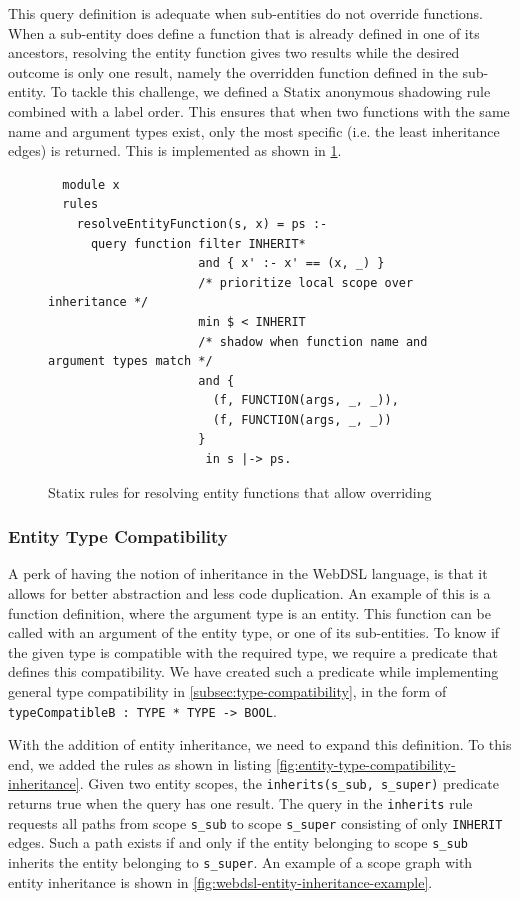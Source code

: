      This query definition is adequate when sub-entities do not override functions. When a sub-entity does define a function that is already defined in one of its ancestors, resolving the entity function gives two results while the desired outcome is only one result, namely the overridden function defined in the sub-entity. To tackle this challenge, we defined a Statix anonymous shadowing rule combined with a label order. This ensures that when two functions with the same name and argument types exist, only the most specific (i.e. the least inheritance edges) is returned. This is implemented as shown in \cref{fig:entity-function-resolve-with-overriding}.

      \begin{figure}
        \begin{verbatim}
  module x
  rules
    resolveEntityFunction(s, x) = ps :-
      query function filter INHERIT*
                     and { x' :- x' == (x, _) }
                     /* prioritize local scope over inheritance */
                     min $ < INHERIT
                     /* shadow when function name and argument types match */
                     and {
                       (f, FUNCTION(args, _, _)),
                       (f, FUNCTION(args, _, _))
                     }
                      in s |-> ps.
        \end{verbatim}
        \caption{\label{fig:entity-function-resolve-with-overriding}Statix rules for resolving entity functions that allow overriding}
      \end{figure}

    \subsubsection{Entity Type Compatibility}

      A perk of having the notion of inheritance in the WebDSL language, is that it allows for better abstraction and less code duplication. An example of this is a function definition, where the argument type is an entity. This function can be called with an argument of the entity type, or one of its sub-entities. To know if the given type is compatible with the required type, we require a predicate that defines this compatibility. We have created such a predicate while implementing general type compatibility in \cref{subsec:type-compatibility}, in the form of \lstinline|typeCompatibleB : TYPE * TYPE -> BOOL|.

      With the addition of entity inheritance, we need to expand this definition. To this end, we added the rules as shown in listing \cref{fig:entity-type-compatibility-inheritance}. Given two entity scopes, the \texttt{inherits(s\_sub, s\_super)} predicate returns true when the query has one result. The query in the \texttt{inherits} rule requests all paths from scope \texttt{s\_sub} to scope \texttt{s\_super} consisting of only \texttt{INHERIT} edges. Such a path exists if and only if the entity belonging to scope \texttt{s\_sub} inherits the entity belonging to \texttt{s\_super}. An example of a scope graph with entity inheritance is shown in \cref{fig:webdsl-entity-inheritance-example}.

